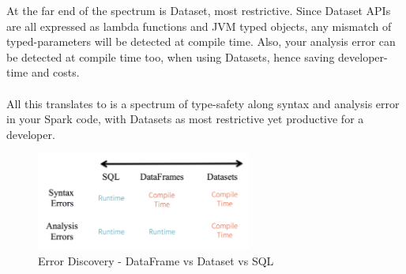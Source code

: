 \documentclass[10pt,a4paper]{article}
\newcommand{\nline}{\\~\\}
\begin{document}
 	At the far end of the spectrum is Dataset, most restrictive. Since Dataset APIs are all expressed as lambda functions and JVM typed objects, any mismatch of typed-parameters will be detected at compile time. Also, your analysis error can be detected at compile time too, when using Datasets, hence saving developer-time and costs. \nline
 	All this translates to is a spectrum of type-safety along syntax and analysis error in your Spark code, with Datasets as most restrictive yet productive for a developer.
  \begin{figure}[ht!]
 \hfill \includegraphics[width=200pt]{images/spark-dataset-error-discovery}
 \hspace*{\fill}
 \caption{Error Discovery - DataFrame vs Dataset vs SQL}
 \end{figure}
 \pagebreak
\end{document}
